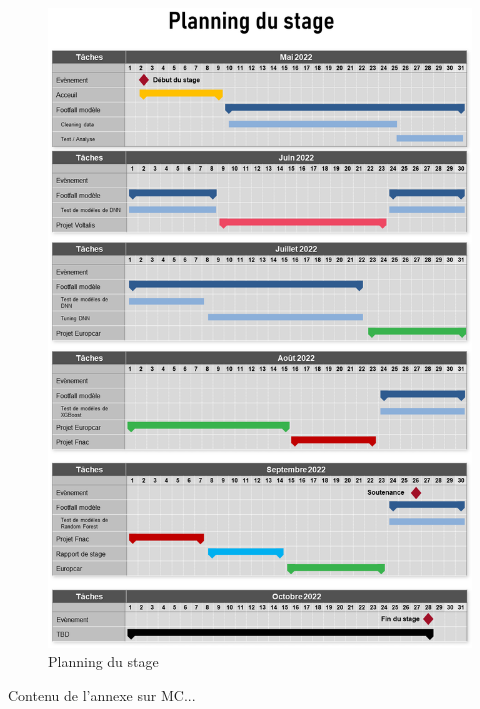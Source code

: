 \documentclass{themeensg}
\begin{document}
\begin{appendices} 
\label{beginappendices}
\label{planning_gannt}

\begin{figure}[H]
  \centering
  \includegraphics[width=13cm]{images/graphs/gannt.png}
  \caption{Planning du stage}
\end{figure}

\label{annexemc}
Contenu de l'annexe sur MC...

\end{appendices} 
\end{document}
